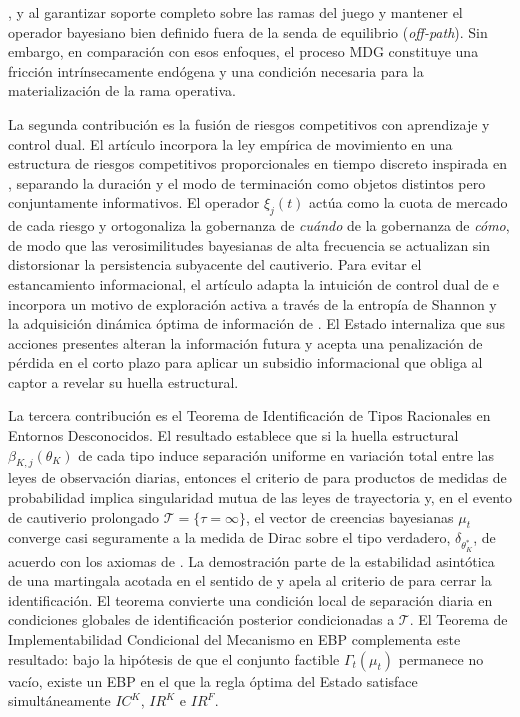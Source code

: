 \documentclass[review,authoryear,12pt]{elsarticle}
\theoremstyle{plain}
\theoremstyle{definition}
\newcommand{\1}{\mathbf{1}}
\newcommand{\Dirac}{\delta}
\begin{document}
\citet{Selten1975Perfectness}, \citet{KrepsWilson1982} y \citet{FudenbergTirole1991} al garantizar soporte completo sobre las ramas del juego y mantener el operador bayesiano bien definido fuera de la senda de equilibrio (\textit{off-path}). Sin embargo, en comparación con esos enfoques, el proceso MDG constituye una fricción intrínsecamente endógena y una condición necesaria para la materialización de la rama operativa.

La segunda contribución es la fusión de riesgos competitivos con aprendizaje y control dual. El artículo incorpora la ley empírica de movimiento en una estructura de riesgos competitivos proporcionales en tiempo discreto inspirada en \citet{Cox1972}, separando la duración y el modo de terminación como objetos distintos pero conjuntamente informativos. El operador $\xi_j(t)$ actúa como la cuota de mercado de cada riesgo y ortogonaliza la gobernanza de \emph{cuándo} de la gobernanza de \emph{cómo}, de modo que las verosimilitudes bayesianas de alta frecuencia se actualizan sin distorsionar la persistencia subyacente del cautiverio. Para evitar el estancamiento informacional, el artículo adapta la intuición de control dual de \citet{Feldbaum1965} e incorpora un motivo de exploración activa a través de la entropía de Shannon \citet{Shannon1948} y la adquisición dinámica óptima de información de \citet{Zhong2022}. El Estado internaliza que sus acciones presentes alteran la información futura y acepta una penalización de pérdida en el corto plazo para aplicar un subsidio informacional que obliga al captor a revelar su huella estructural.

La tercera contribución es el Teorema de Identificación de Tipos Racionales en Entornos Desconocidos. El resultado establece que si la huella estructural $\beta_{K,j}(\theta_K)$ de cada tipo induce separación uniforme en variación total entre las leyes de observación diarias, entonces el criterio de \citet{Kakutani1948} para productos de medidas de probabilidad implica singularidad mutua de las leyes de trayectoria y, en el evento de cautiverio prolongado $\mathcal{T}=\{\tau=\infty\}$, el vector de creencias bayesianas $\mu_t$ converge casi seguramente a la medida de Dirac sobre el tipo verdadero, $\Dirac_{\theta_K^\ast}$, de acuerdo con los axiomas de \citet{BlackwellDubins1962}. La demostración parte de la estabilidad asintótica de una martingala acotada en el sentido de \citet{Doob1953Stochastic} y apela al criterio de \citet{Kakutani1948} para cerrar la identificación. El teorema convierte una condición local de separación diaria en condiciones globales de identificación posterior condicionadas a $\mathcal{T}$. El Teorema de Implementabilidad Condicional del Mecanismo en EBP complementa este resultado: bajo la hipótesis de que el conjunto factible $\Gamma_t(\mu_t)$ permanece no vacío, existe un EBP en el que la regla óptima del Estado satisface simultáneamente $IC^K$, $IR^K$ e $IR^F$.
\end{document}
